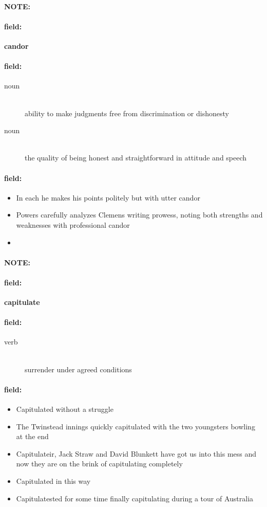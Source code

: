 \documentclass[12pt]{article}
\newenvironment{note}{\paragraph{NOTE:}}{}
\newenvironment{field}{\paragraph{field:}}{}
\begin{document}
\begin{note}
\begin{field}
\textbf{\large candor}
\end{field}


\begin{field}
\begin{description}
\item[noun] \hfill \\ 
ability to make judgments free from discrimination or dishonesty

\item[noun] \hfill \\ 
the quality of being honest and straightforward in attitude and speech

\end{description}
\end{field}

\begin{field}
\begin{itemize}
\item In each he makes his points politely but with utter candor
\item Powers carefully analyzes Clemens writing prowess, noting both strengths and weaknesses with professional candor
\item 
\end{itemize}
\end{field}
\end{note}
\begin{note}
\begin{field}
\textbf{\large capitulate}
\end{field}


\begin{field}
\begin{description}
\item[verb] \hfill \\ 
surrender under agreed conditions

\end{description}
\end{field}

\begin{field}
\begin{itemize}
\item Capitulated without a struggle
\item The Twinstead innings quickly capitulated with the two youngsters bowling at the end
\item Capitulateir, Jack Straw and David Blunkett have got us into this mess and now they are on the brink of capitulating completely
\item Capitulated in this way
\item Capitulatested for some time finally capitulating during a tour of Australia
\end{itemize}
\end{field}
\end{note}
\end{document}
